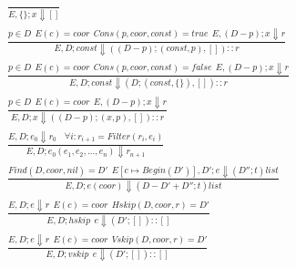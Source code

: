 \begin{figure*}[ht!]
\begin{gather*}
  \tag{\sc E-Empty}\label{rule:empty}
  \frac
  {}
  {E,\{\};x \Downarrow []}\\
  \tag{\sc E-C1}\label{rule:c1}
  \frac
  {p \in D ~~ E(c)=coor ~~ Cons(p, coor, const)=true ~~ E,(D-p);x \Downarrow r}
  {E,D;const \Downarrow ((D-p);(const, p),[])::r}\\
  \tag{\sc E-C2}\label{rule:c2}
  \frac
  {p \in D ~~ E(c)=coor ~~ Cons(p, coor, const)=false ~~ E,(D-p);x \Downarrow r}
  {E,D;const \Downarrow (D;(const, \{\}),[])::r}\\
  \tag{\sc E-X}\label{rule:x}
  \frac
  {p \in D ~~ E(c)=coor ~~ E,(D-p);x \Downarrow r}
  {E,D;x \Downarrow ((D-p);(x, p),[])::r}\\
  \tag{\sc E-Constraint}\label{rule:Constraint}
  \frac
  {E,D;e_0 \Downarrow r_0 ~~~~ \forall i: r_{i+1}=Filter(r_i, e_i)}
  {E,D;e_0(e_1, e_2, ..., e_n) \Downarrow r_{n+1}}\\
  \tag{\sc E-Coor}\label{rule:coor}
  \frac
  {Find(D, coor, nil)=D' ~~ E[c \mapsto Begin(D')],D';e \Downarrow (D'';t)list}
  {E,D;e(coor) \Downarrow (D-D'+D'';t)list}\\
  \tag{\sc E-Hskip}\label{rule:hskip}
  \frac
  {E,D;e \Downarrow r ~~ E(c)=coor ~~ Hskip(D, coor, r)=D'}
  {E,D;hskip~~e \Downarrow (D';[])::[]}\\
  \tag{\sc E-Vskip}\label{rule:vskip}
  \frac
  {E,D;e \Downarrow r ~~ E(c)=coor ~~ Vskip(D, coor, r)=D'}
  {E,D;vskip~~e \Downarrow (D';[])::[]}\\
  \tag{\sc E-Union}\label{rule:union}

\end{gather*}
\end{figure*}
